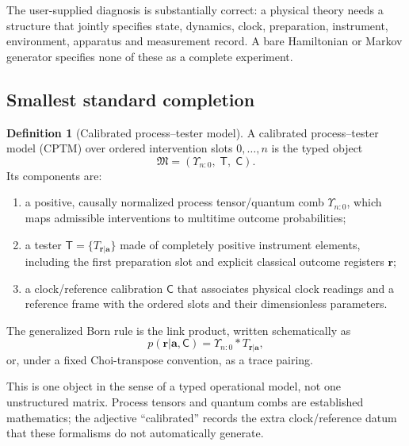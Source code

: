 \documentclass[11pt,a4paper]{article}
\theoremstyle{definition}
\newtheorem{definition}[theorem]{Definition}
\theoremstyle{remark}
\begin{document}
The user-supplied diagnosis is substantially correct: a physical theory needs a structure that jointly specifies state, dynamics, clock, preparation, instrument, environment, apparatus and measurement record. A bare Hamiltonian or Markov generator specifies none of these as a complete experiment.

\subsection{Smallest standard completion}

\begin{definition}[Calibrated process--tester model]\label{def:cptm}
A calibrated process--tester model (CPTM) over ordered intervention slots $0,\ldots,n$ is the typed object
\[
 \mathfrak M=(\Upsilon_{n:0},\;\mathsf T,\;\mathsf C).
\]
Its components are:
\begin{enumerate}[label=(\alph*)]
\item a positive, causally normalized process tensor/quantum comb $\Upsilon_{n:0}$, which maps admissible interventions to multitime outcome probabilities;
\item a tester $\mathsf T=\{T_{\mathbf r|\mathbf a}\}$ made of completely positive instrument elements, including the first preparation slot and explicit classical outcome registers $\mathbf r$;
\item a clock/reference calibration $\mathsf C$ that associates physical clock readings and a reference frame with the ordered slots and their dimensionless parameters.
\end{enumerate}
The generalized Born rule is the link product, written schematically as
\[
 p(\mathbf r|\mathbf a,\mathsf C)
 =\Upsilon_{n:0}*T_{\mathbf r|\mathbf a},
\]
or, under a fixed Choi-transpose convention, as a trace pairing.
\end{definition}

This is one object in the sense of a typed operational model, not one unstructured matrix. Process tensors and quantum combs are established mathematics; the adjective ``calibrated'' records the extra clock/reference datum that these formalisms do not automatically generate.
\end{document}
